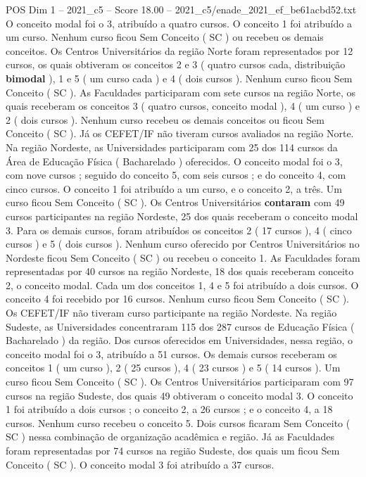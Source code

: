 \begin{textsample}{POS Dim 1 – 2021\_c5 – Score 18.00 – 2021\_c5/enade\_2021\_ef\_be61acbd52.txt}
O conceito modal foi o 3, atribuído a quatro cursos.
O conceito 1 foi atribuído a um curso.
Nenhum curso ficou Sem Conceito ( SC ) ou recebeu os demais conceitos.
Os Centros Universitários da região Norte foram representados por 12 cursos, os quais obtiveram os conceitos 2 e 3 ( quatro cursos cada, distribuição \textbf{bimodal} ), 1 e 5 ( um curso cada ) e 4 ( dois cursos ).
Nenhum curso ficou Sem Conceito ( SC ).
As Faculdades participaram com sete cursos na região Norte, os quais receberam os conceitos 3 ( quatro cursos, conceito modal ), 4 ( um curso ) e 2 ( dois cursos ).
Nenhum curso recebeu os demais conceitos ou ficou Sem Conceito ( SC ).
Já os CEFET/IF não tiveram cursos avaliados na região Norte.
Na região Nordeste, as Universidades participaram com 25 dos 114 cursos da Área de Educação Física ( Bacharelado ) oferecidos.
O conceito modal foi o 3, com nove cursos ; seguido do conceito 5, com seis cursos ; e do conceito 4, com cinco cursos.
O conceito 1 foi atribuído a um curso, e o conceito 2, a três.
Um curso ficou Sem Conceito ( SC ).
Os Centros Universitários \textbf{contaram} com 49 cursos participantes na região Nordeste, 25 dos quais receberam o conceito modal 3.
Para os demais cursos, foram atribuídos os conceitos 2 ( 17 cursos ), 4 ( cinco cursos ) e 5 ( dois cursos ).
Nenhum curso oferecido por Centros Universitários no Nordeste ficou Sem Conceito ( SC ) ou recebeu o conceito 1.
As Faculdades foram representadas por 40 cursos na região Nordeste, 18 dos quais receberam conceito 2, o conceito modal.
Cada um dos conceitos 1, 4 e 5 foi atribuído a dois cursos.
O conceito 4 foi recebido por 16 cursos.
Nenhum curso ficou Sem Conceito ( SC ).
Os CEFET/IF não tiveram curso participante na região Nordeste.
Na região Sudeste, as Universidades concentraram 115 dos 287 cursos de Educação Física ( Bacharelado ) da região.
Dos cursos oferecidos em Universidades, nessa região, o conceito modal foi o 3, atribuído a 51 cursos.
Os demais cursos receberam os conceitos 1 ( um curso ), 2 ( 25 cursos ), 4 ( 23 cursos ) e 5 ( 14 cursos ).
Um curso ficou Sem Conceito ( SC ).
Os Centros Universitários participaram com 97 cursos na região Sudeste, dos quais 49 obtiveram o conceito modal 3.
O conceito 1 foi atribuído a dois cursos ; o conceito 2, a 26 cursos ; e o conceito 4, a 18 cursos.
Nenhum curso recebeu o conceito 5.
Dois cursos ficaram Sem Conceito ( SC ) nessa combinação de organização acadêmica e região.
Já as Faculdades foram representadas por 74 cursos na região Sudeste, dos quais um ficou Sem Conceito ( SC ).
O conceito modal 3 foi atribuído a 37 cursos.

\end{textsample}
